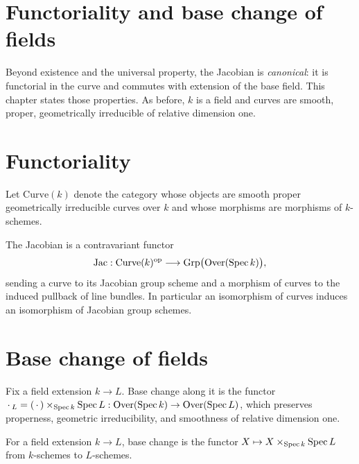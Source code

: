 \section{Functoriality and base change of fields}
\label{pa-chap:BaseChange}

Beyond existence and the universal property, the Jacobian is \emph{canonical}: it is functorial in
the curve and commutes with extension of the base field. This chapter states those properties. As
before, \(k\) is a field and curves are smooth, proper, geometrically irreducible of relative
dimension one.

\section{Functoriality}

\begin{definition}
  \label{pa-def:Curve}

  Let \(\mathrm{Curve}(k)\) denote the category whose objects are smooth proper geometrically
  irreducible curves over \(k\) and whose morphisms are morphisms of \(k\)-schemes.
\end{definition}

\begin{definition}
  \label{pa-def:jacobian_functor}

  The Jacobian is a contravariant functor
  \[
    \mathrm{Jac} : \mathrm{Curve}(k)^{\mathrm{op}} \longrightarrow \mathrm{Grp}\bigl(\mathrm{Over}(\operatorname{Spec} k)\bigr),
  \]
  sending a curve to its Jacobian group scheme and a morphism of curves to the induced pullback of
  line bundles. In particular an isomorphism of curves induces an isomorphism of Jacobian group
  schemes.
\end{definition}

\section{Base change of fields}

Fix a field extension \(k \to L\). Base change along it is the functor
\(\,\cdot\,_L = (\,\cdot\,) \times_{\operatorname{Spec} k} \operatorname{Spec} L : \mathrm{Over}(\operatorname{Spec} k) \to \mathrm{Over}(\operatorname{Spec} L)\), which
preserves properness, geometric irreducibility, and smoothness of relative dimension one.

\begin{definition}
  \label{pa-def:baseChange}
  \leanok

  For a field extension \(k \to L\), base change is the functor
  \(X \mapsto X \times_{\operatorname{Spec} k} \operatorname{Spec} L\) from \(k\)-schemes to \(L\)-schemes.
\end{definition}

